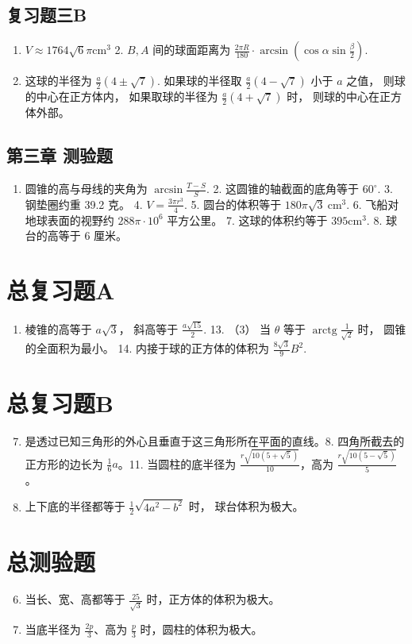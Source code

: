\subsection{复习题三B}

\begin{enumerate}
\item
  \(V \approx 1764\sqrt{6}\pi \mathrm{cm}^3\) 2. \(B, A\) 间的球面距离为
  \(\frac{2\pi R}{180} \cdot \arcsin \left( \cos \alpha \sin \frac{\beta}{2} \right)\).
\item
  这球的半径为 \(\frac{a}{2} (4 \pm \sqrt{7})\). 如果球的半径取
  \(\frac{a}{2} (4 - \sqrt{7})\) 小于 \(a\) 之值，
  则球的中心在正方体内， 如果取球的半径为 \(\frac{a}{2} (4 + \sqrt{7})\)
  时， 则球的中心在正方体外部。
\end{enumerate}

\subsection{第三章 测验题}

\begin{enumerate}
\item
  圆锥的高与母线的夹角为 \(\arcsin \frac{T - S}{S}\). 2.
  这圆锥的轴截面的底角等于 \(60^{\circ}\). 3. 钢垫圈约重 39.2 克。 4.
  \(V = \frac{3\pi r^{3}}{4}\). 5. 圆台的体积等于
  \(180\pi \sqrt{3} \mathrm{~cm}^{3}\). 6. 飞船对地球表面的视野约
  \(288\pi \cdot 10^{6}\) 平方公里。 7. 这球的体积约等于
  \(395\mathrm{cm}^{3}\). 8. 球台的高等于 6 厘米。
\end{enumerate}

\section{总复习题A}

\begin{enumerate}
\item
  棱锥的高等于 \(a\sqrt{3}\)， 斜高等于 \(\frac{a\sqrt{15}}{2}\). 13.
  （3） 当 \(\theta\) 等于 \(\operatorname{arctg} \frac{1}{\sqrt{2}}\)
  时， 圆锥的全面积为最小。 14. 内接于球的正方体的体积为
  \(\frac{8\sqrt{3}}{9} B^{2}\).
\end{enumerate}

\section{总复习题B}

\begin{enumerate}
\setcounter{enumi}{6}
\item
  是透过已知三角形的外心且垂直于这三角形所在平面的直线。8.
  四角所截去的正方形的边长为 \(\frac{1}{6} a\)。11. 当圆柱的底半径为
  \(\frac{r\sqrt{10(5 + \sqrt{5})}}{10}\)，高为
  \(\frac{r\sqrt{10(5 - \sqrt{5})}}{5}\)。
\item
  上下底的半径都等于 \(\frac{1}{2} \sqrt{4a^2 - b^2}\) 时，
  球台体积为极大。
\end{enumerate}

\section{总测验题}

\begin{enumerate}
\setcounter{enumi}{5}
\item
  当长、宽、高都等于 \(\frac{25}{\sqrt{3}}\) 时，正方体的体积为极大。
\item
  当底半径为 \(\frac{2p}{3}\)、高为 \(\frac{p}{3}\)
  时，圆柱的体积为极大。
\end{enumerate}
